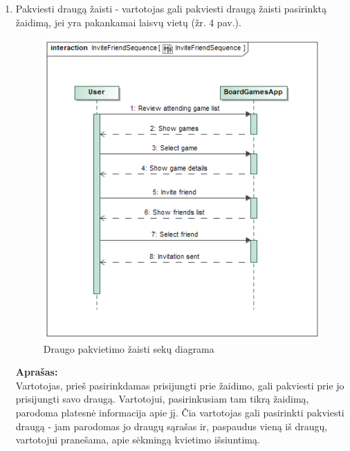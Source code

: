 \documentclass{VUMIFPSkursinis}
\begin{document}
\begin{enumerate}
			\item Pakviesti draugą žaisti - vartotojas gali pakviesti draugą žaisti 
			pasirinktą žaidimą, jei yra pakankamai laisvų vietų (žr. 4 pav.).
				\begin{figure}[H]
					\centering
					\includegraphics[scale=0.5]{img/InviteFriendSequence}
					\caption{Draugo pakvietimo žaisti sekų diagrama}
					\label{img:InviteFriendSequence}
				\end{figure}
				\textbf{Aprašas:}\\
					Vartotojas, prieš pasirinkdamas prisijungti prie žaidimo, gali 
					pakviesti prie jo prisijungti savo draugą. Vartotojui, 
					pasirinkusiam tam tikrą žaidimą, parodoma platesnė informacija 
					apie jį. Čia vartotojas gali pasirinkti pakviesti draugą - 
					jam parodomas jo draugų sąrašas ir, paspaudus vieną iš draugų, 
					vartotojui pranešama, apie sėkmingą kvietimo išsiuntimą.
				

\end{enumerate}
\end{document}
